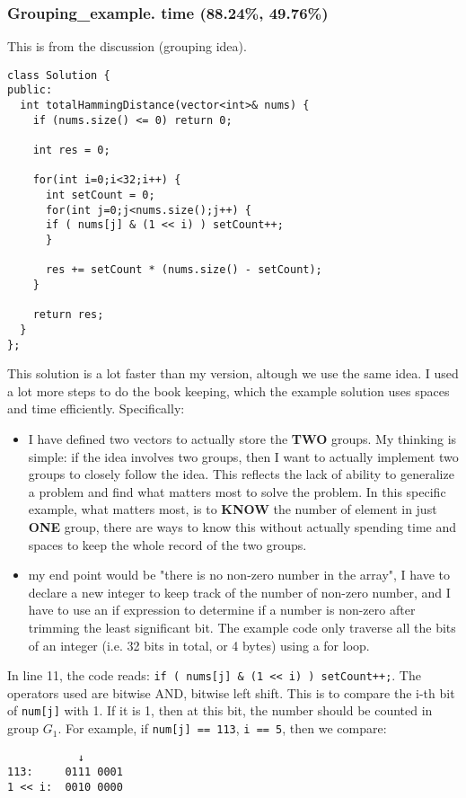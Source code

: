\documentclass[12pt]{book}
\begin{document}
\subsubsection{Grouping\_example. time (88.24\%, 49.76\%)}
\label{sec:org5c57abb}
This is from the discussion (grouping idea).
\begin{verbatim}
class Solution {
public:
  int totalHammingDistance(vector<int>& nums) {
    if (nums.size() <= 0) return 0;

    int res = 0;

    for(int i=0;i<32;i++) {
      int setCount = 0;
      for(int j=0;j<nums.size();j++) {
	  if ( nums[j] & (1 << i) ) setCount++;
      }

      res += setCount * (nums.size() - setCount);
    }

    return res;
  }
};
\end{verbatim}

This solution is a lot faster than my version, altough we use the same idea. I used a lot more steps to do the book keeping, which the example solution uses spaces and time efficiently. Specifically:
\begin{itemize}
\item I have defined two vectors to actually store the \textbf{TWO} groups. My thinking is simple: if the idea involves two groups, then I want to actually implement two groups to closely follow the idea. This reflects the lack of ability to generalize a problem and find what matters most to solve the problem. In this specific example, what matters most, is to \textbf{KNOW} the number of element in just \textbf{ONE} group, there are ways to know this without actually spending time and spaces to keep the whole record of the two groups.
\item my end point would be "there is no non-zero number in the array", I have to declare a new integer to keep track of the number of non-zero number, and I have to use an if expression to determine if a number is non-zero after trimming the least significant bit.  The example code only traverse all the bits of an integer (i.e. 32 bits in total, or 4 bytes) using a for loop.
\end{itemize}

In line 11, the code reads: \texttt{if ( nums[j] \& (1 << i) ) setCount++;}. The operators used are bitwise AND, bitwise left shift. This is to compare the i-th bit of \texttt{num[j]} with 1. If it is 1, then at this bit, the number should be counted in group \(G_1\). For example, if \texttt{num[j] == 113}, \texttt{i == 5}, then we compare:
\begin{verbatim}
           ↓
113:     0111 0001
1 << i:  0010 0000
\end{verbatim}
\end{document}
